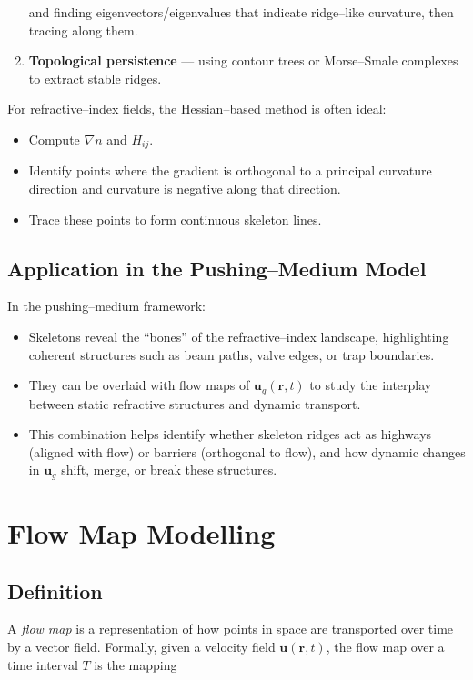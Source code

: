 \documentclass[10pt,a4paper]{article}
\begin{document}
\begin{multicols}{2}
\begin{enumerate}
    and finding eigenvectors/eigenvalues that indicate ridge--like curvature, then tracing along them.
    \item \textbf{Topological persistence} --- using contour trees or Morse--Smale complexes to extract stable ridges.
\end{enumerate}

For refractive--index fields, the Hessian--based method is often ideal:
\begin{itemize}
    \item Compute $\nabla n$ and $H_{ij}$.
    \item Identify points where the gradient is orthogonal to a principal curvature direction and curvature is negative along that direction.
    \item Trace these points to form continuous skeleton lines.
\end{itemize}

\subsection*{Application in the Pushing--Medium Model}
In the pushing--medium framework:
\begin{itemize}
    \item Skeletons reveal the ``bones'' of the refractive--index landscape, highlighting coherent structures such as beam paths, valve edges, or trap boundaries.
    \item They can be overlaid with flow maps of $\mathbf{u}_g(\mathbf{r},t)$ to study the interplay between static refractive structures and dynamic transport.
    \item This combination helps identify whether skeleton ridges act as highways (aligned with flow) or barriers (orthogonal to flow), and how dynamic changes in $\mathbf{u}_g$ shift, merge, or break these structures.
\end{itemize}

\columnbreak

\section*{Flow Map Modelling}

\subsection*{Definition}
A \emph{flow map} is a representation of how points in space are transported over time by a vector field.  
Formally, given a velocity field $\mathbf{u}(\mathbf{r},t)$, the flow map over a time interval $T$ is the mapping



\end{multicols}
\end{document}
